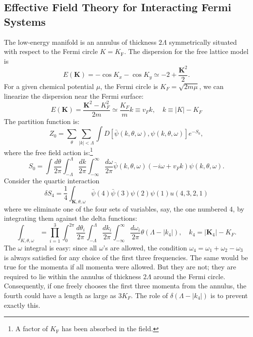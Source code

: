 \subsection{Effective Field Theory for Interacting Fermi Systems}
The low-energy manifold is an annulus of thickness $2 \Lambda$ symmetrically situated with respect to the Fermi circle $K=K_{\mathrm{F}}$.
The dispersion for the free lattice model is
\begin{equation}
	E(\bm K) = -\cos K_x - \cos K_y \simeq -2 + \frac{\bm K^2}{2}.
\end{equation}
For a given chemical potential $\mu$, the Fermi circle is $K_F = \sqrt{2m\mu}$, we can linearize the dispersion near the Fermi surface:
\begin{equation}
	E(\bm K) = \frac{\bm K^2-K_F^2}{2m} \simeq \frac{K_F}{m}k \equiv v_F k, \quad
	k\equiv |K|-K_F
\end{equation}
The partition function is:
\begin{equation}
	Z_0 = \sum_\theta \sum_{|k|<\Lambda}\int D\left[\bar\psi(k,\theta,\omega),\psi(k,\theta,\omega)\right] e^{-S_0},
\end{equation}
where the free field action is:\footnote{A factor of $K_{\mathrm{F}}$ has been absorbed in the field.}
\begin{equation}
	S_0 = \int \frac{d\theta}{2\pi} \int^\Lambda_{-\Lambda}\frac{dk}{2\pi} \int^\infty_{-\infty}\frac{d\omega}{2\pi} \bar\psi(k,\theta,\omega)(-i\omega+v_F k)\psi(k,\theta,\omega).
\end{equation}
Consider the quartic interaction
\begin{equation}
	\delta S_4 = \frac{1}{4}\int_{\bm K,\theta,\omega} \bar\psi(4)\bar\psi(3)\psi(2)\psi(1)u(4,3,2,1)
\end{equation}
where we eliminate one of the four sets of variables, say, the one numbered 4, by integrating them against the delta functions:
\begin{equation}
	\int_{K,\theta,\omega}
	=\prod_{i=1}^{3} \int_{0}^{2 \pi} \frac{d \theta_{i}}{2 \pi} \int_{-\Lambda}^{\Lambda} \frac{d k_{i}}{2 \pi} \int_{-\infty}^{\infty} \frac{d \omega_{i}}{2 \pi} \theta\left(\Lambda-\left|k_{4}\right|\right), \quad 
	k_4 = |\bm K_4|-K_F.
\end{equation}
The $\omega$ integral is easy: since all $\omega$'s are allowed, the condition $\omega_4=\omega_1+\omega_2-\omega_3$ is always satisfied for any choice of the first three frequencies. 
The same would be true for the momenta if all momenta were allowed. 
But they are not; they are required to lie within the annulus of thickness $2\Lambda$ around the Fermi circle. 
Consequently, if one freely chooses the first three momenta from the annulus, the fourth could have a length as large as $3K_F$. 
The role of $\delta(\Lambda-|k_4|)$ is to prevent exactly this.

